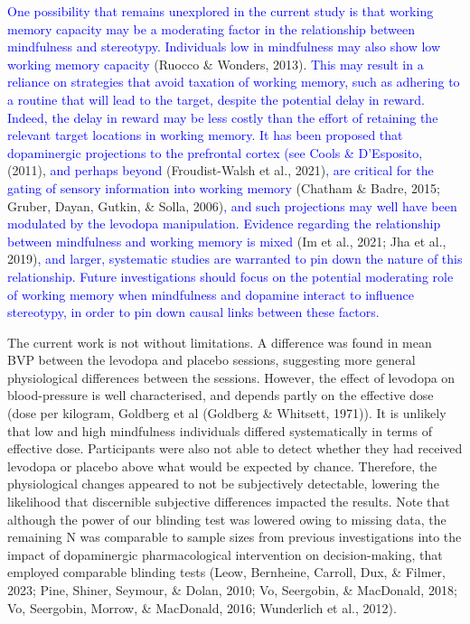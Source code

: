 \documentclass[
  man]{apa6}
\begin{document}
\textcolor{blue}{One possibility that remains unexplored in the current study is that working memory capacity may be a moderating factor in the relationship between mindfulness and stereotypy. Individuals low in mindfulness may also show low working memory capacity} (Ruocco \& Wonders, 2013). \textcolor{blue}{This may result in a reliance on strategies that avoid taxation of working memory, such as adhering to a routine that will lead to the target, despite the potential delay in reward. Indeed, the delay in reward may be less costly than the effort of retaining the relevant target locations in working memory. It has been proposed that dopaminergic projections to the prefrontal cortex (see Cools \& D’Esposito,} (2011), \textcolor{blue}{and perhaps beyond} (Froudist-Walsh et al., 2021)\textcolor{blue}{, are critical for the gating of sensory information into working memory} (Chatham \& Badre, 2015; Gruber, Dayan, Gutkin, \& Solla, 2006)\textcolor{blue}{, and such projections may well have been modulated by the levodopa manipulation. Evidence regarding the relationship between mindfulness and working memory is mixed} (Im et al., 2021; Jha et al., 2019)\textcolor{blue}{, and larger, systematic studies are warranted to pin down the nature of this relationship. Future investigations should focus on the potential moderating role of working memory when mindfulness and dopamine interact to influence stereotypy, in order to pin down causal links between these factors.}

The current work is not without limitations. A difference was found in mean BVP between the levodopa and placebo sessions, suggesting more general physiological differences between the sessions. However, the effect of levodopa on blood-pressure is well characterised, and depends partly on the effective dose (dose per kilogram, Goldberg et al (Goldberg \& Whitsett, 1971)). It is unlikely that low and high mindfulness individuals differed systematically in terms of effective dose. Participants were also not able to detect whether they had received levodopa or placebo above what would be expected by chance. Therefore, the physiological changes appeared to not be subjectively detectable, lowering the likelihood that discernible subjective differences impacted the results. Note that although the power of our blinding test was lowered owing to missing data, the remaining N was comparable to sample sizes from previous investigations into the impact of dopaminergic pharmacological intervention on decision-making, that employed comparable blinding tests (Leow, Bernheine, Carroll, Dux, \& Filmer, 2023; Pine, Shiner, Seymour, \& Dolan, 2010; Vo, Seergobin, \& MacDonald, 2018; Vo, Seergobin, Morrow, \& MacDonald, 2016; Wunderlich et al., 2012).
\end{document}
